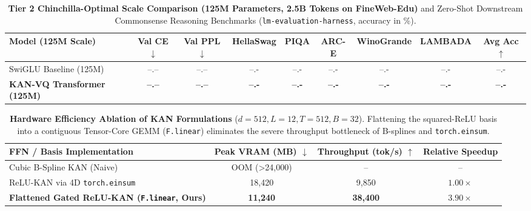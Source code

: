\documentclass[11pt,a4paper]{article}
\begin{document}
\begin{table}[htbp]
\centering
\caption{\textbf{Tier 2 Chinchilla-Optimal Scale Comparison (125M Parameters, 2.5B Tokens on FineWeb-Edu)} and Zero-Shot Downstream Commonsense Reasoning Benchmarks (\texttt{lm-evaluation-harness}, accuracy in \%).}
\label{tab:tier2_flagship}
\small
\begin{tabular}{@{}lcccccccc@{}}
\toprule
\textbf{Model (125M Scale)} & \textbf{Val CE} $\downarrow$ & \textbf{Val PPL} $\downarrow$ & \textbf{HellaSwag} & \textbf{PIQA} & \textbf{ARC-E} & \textbf{WinoGrande} & \textbf{LAMBADA} & \textbf{Avg Acc} $\uparrow$ \\
\midrule
SwiGLU Baseline (125M) & --.-- & --.-- & --.- & --.- & --.- & --.- & --.- & --.- \\
\textbf{KAN-VQ Transformer (125M)} & \textbf{--.--} & \textbf{--.--} & \textbf{--.-} & \textbf{--.-} & \textbf{--.-} & \textbf{--.-} & \textbf{--.-} & \textbf{--.-} \\
\bottomrule
\end{tabular}
\end{table}

\begin{table}[htbp]
\centering
\caption{\textbf{Hardware Efficiency Ablation of KAN Formulations} ($d=512, L=12, T=512, B=32$). Flattening the squared-ReLU basis into a contiguous Tensor-Core GEMM (\texttt{F.linear}) eliminates the severe throughput bottleneck of B-splines and \texttt{torch.einsum}.}
\label{tab:hardware_efficiency}
\small
\begin{tabular}{@{}lccc@{}}
\toprule
\textbf{FFN / Basis Implementation} & \textbf{Peak VRAM (MB)} $\downarrow$ & \textbf{Throughput (tok/s)} $\uparrow$ & \textbf{Relative Speedup} \\
\midrule
Cubic B-Spline KAN (Naive) & OOM (>24,000) & -- & -- \\
ReLU-KAN via 4D \texttt{torch.einsum} & 18,420 & 9,850 & $1.00\times$ \\
\textbf{Flattened Gated ReLU-KAN (\texttt{F.linear}, Ours)} & \textbf{11,240} & \textbf{38,400} & $\mathbf{3.90\times}$ \\
\bottomrule
\end{tabular}
\end{table}
\end{document}
